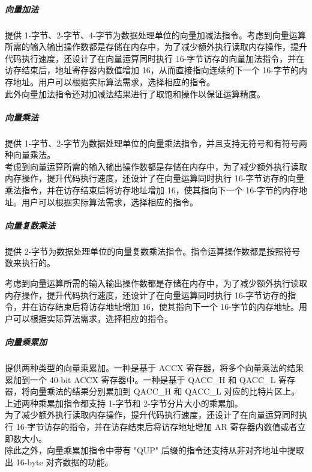 \documentclass[main\_\_CN.tex]{subfiles}
\begin{document}
\subparagraph{向量加法}

\chipname{} 提供 1-字节、2-字节、4-字节为数据处理单位的向量加减法指令。考虑到向量运算所需的输入输出操作数都是存储在内存中，为了减少额外执行读取内存操作，提升代码执行速度，还设计了在向量运算同时执行 16-字节访存的向量加法指令，并在访存结束后，地址寄存器内数值增加 16，从而直接指向连续的下一个 16-字节的内存地址。用户可以根据实际算法需求，选择相应的指令。\\
此外向量加法指令还对加减法结果进行了取饱和操作以保证运算精度。





\subparagraph{向量乘法}

\chipname{} 提供 1-字节、2-字节为数据处理单位的向量乘法指令，并且支持无符号和有符号两种向量乘法。\\
考虑到向量运算所需的输入输出操作数都是存储在内存中，为了减少额外执行读取内存操作，提升代码执行速度，还设计了在向量运算同时执行 16-字节访存的向量乘法指令，并在访存结束后将访存地址增加 16，使其指向下一个 16-字节的内存地址。用户可以根据实际算法需求，选择相应的指令。\\




\subparagraph{向量复数乘法}

\chipname{} 提供 2-字节为数据处理单位的向量复数乘法指令。指令运算操作数都是按照符号数来执行的。

考虑到向量运算所需的输入输出操作数都是存储在内存中，为了减少额外执行读取内存操作，提升代码执行速度，还设计了在向量运算同时执行 16-字节访存的指令，并在访存结束后将访存地址增加 16，使其指向下一个 16-字节的内存地址。用户可以根据实际算法需求，选择相应的指令。\\




\subparagraph{向量乘累加}

\chipname{} 提供两种类型的向量乘累加。一种是基于 ACCX 寄存器，将多个向量乘法的结果累加到一个 40-bit ACCX 寄存器中。一种是基于 QACC\_H 和 QACC\_L 寄存器，将向量乘法的结果分别累加到 QACC\_H 和 QACC\_L 对应的比特片区上。上述两种乘累加指令都支持 1-字节和 2-字节分片大小的乘累加。\\
为了减少额外执行读取内存操作，提升代码执行速度，还设计了在向量运算同时执行 16-字节访存的指令，并在访存结束后将访存地址增加 AR 寄存器内数值或者立即数大小。\\
除此之外，向量乘累加指令中带有 "QUP" 后缀的指令还支持从非对齐地址中提取出 16-byte 对齐数据的功能。
\end{document}
